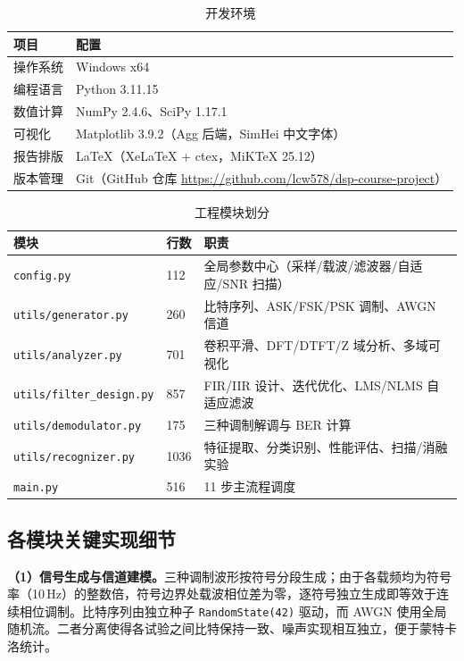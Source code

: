 \documentclass[12pt, a4paper, UTF8]{ctexart}
\begin{document}
\begin{table}[H]
\centering
\caption{开发环境}
\label{tab:env}
\begin{tabular}{ll}
\toprule
项目 & 配置 \\
\midrule
操作系统 & Windows x64 \\
编程语言 & Python 3.11.15 \\
数值计算 & NumPy 2.4.6、SciPy 1.17.1 \\
可视化 & Matplotlib 3.9.2（Agg 后端，SimHei 中文字体） \\
报告排版 & \LaTeX（XeLaTeX + ctex，MiKTeX 25.12） \\
版本管理 & Git（GitHub 仓库 \url{https://github.com/lcw578/dsp-course-project}） \\
\bottomrule
\end{tabular}
\end{table}

\begin{table}[H]
\centering
\caption{工程模块划分}
\label{tab:modules}
\begin{tabular}{lll}
\toprule
模块 & 行数 & 职责 \\
\midrule
\texttt{config.py} & 112 & 全局参数中心（采样/载波/滤波器/自适应/SNR 扫描） \\
\texttt{utils/generator.py} & 260 & 比特序列、ASK/FSK/PSK 调制、AWGN 信道 \\
\texttt{utils/analyzer.py} & 701 & 卷积平滑、DFT/DTFT/Z 域分析、多域可视化 \\
\texttt{utils/filter\_design.py} & 857 & FIR/IIR 设计、迭代优化、LMS/NLMS 自适应滤波 \\
\texttt{utils/demodulator.py} & 175 & 三种调制解调与 BER 计算 \\
\texttt{utils/recognizer.py} & 1036 & 特征提取、分类识别、性能评估、扫描/消融实验 \\
\texttt{main.py} & 516 & 11 步主流程调度 \\
\bottomrule
\end{tabular}
\end{table}

\subsection{各模块关键实现细节}

\textbf{（1）信号生成与信道建模。}三种调制波形按符号分段生成；由于各载频均为符号率（10\,Hz）的整数倍，符号边界处载波相位差为零，逐符号独立生成即等效于连续相位调制。比特序列由独立种子 \texttt{RandomState(42)} 驱动，而 AWGN 使用全局随机流。二者分离使得各试验之间比特保持一致、噪声实现相互独立，便于蒙特卡洛统计。
\end{document}
